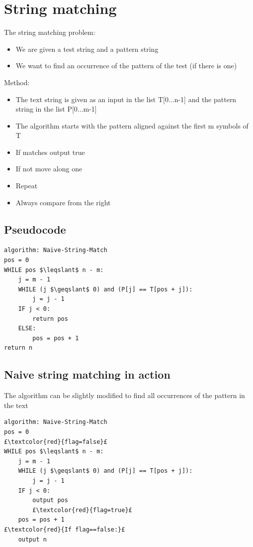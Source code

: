 \documentclass{article}[18pt]
\begin{document}
\section{String matching}
The string matching problem:
\begin{itemize}
	\item We are given a test string and a pattern string
	\item We want to find an occurrence of the pattern of the test (if there is one)
\end{itemize}
Method:
\begin{itemize}
	\item The text string is given as an input in the list T[0...n-1] and the pattern string in the list P[0...m-1]
	\item The algorithm starts with the pattern aligned against the first m symbols of T
	\item If matches output true
	\item If not move along one
	\item Repeat
	\item Always compare from the right
\end{itemize}
\subsection{Pseudocode}
\begin{lstlisting}[tabsize=4,mathescape]
algorithm: Naive-String-Match
pos = 0
WHILE pos $\leqslant$ n - m:
	j = m - 1
	WHILE (j $\geqslant$ 0) and (P[j] == T[pos + j]):
		j = j - 1
	IF j < 0:
		return pos
	ELSE:
		pos = pos + 1
return n
\end{lstlisting}
\subsection{Naive string matching in action}
The algorithm can be slightly modified to find all occurrences of the pattern in the text
\begin{lstlisting}[tabsize=4,mathescape,escapechar=£]
algorithm: Naive-String-Match
pos = 0
£\textcolor{red}{flag=false}£
WHILE pos $\leqslant$ n - m:
	j = m - 1
	WHILE (j $\geqslant$ 0) and (P[j] == T[pos + j]):
		j = j - 1
	IF j < 0:
		output pos
		£\textcolor{red}{flag=true}£
	pos = pos + 1
£\textcolor{red}{If flag==false:}£
	output n
\end{lstlisting}
\end{document}
